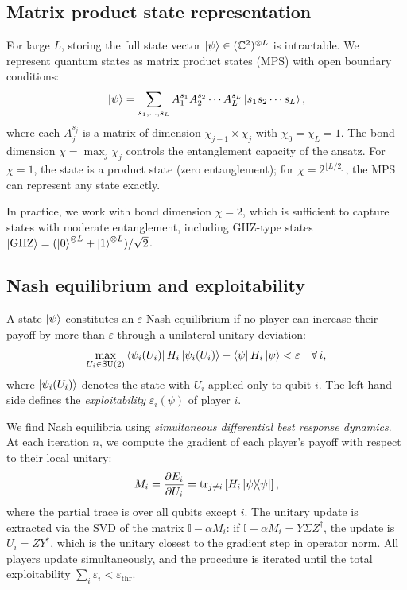 \documentclass[12pt]{article}
\begin{document}
\subsection{Matrix product state representation}

For large $L$, storing the full state vector $\ket{\psi} \in (\mathbb{C}^2)^{\otimes L}$ is intractable.
We represent quantum states as matrix product states (MPS) with open boundary conditions:
\begin{equation}
    \ket{\psi} = \sum_{s_1, \ldots, s_L} A_1^{s_1} A_2^{s_2} \cdots A_L^{s_L} \ket{s_1 s_2 \cdots s_L},
\end{equation}
where each $A_j^{s_j}$ is a matrix of dimension $\chi_{j-1} \times \chi_j$ with $\chi_0 = \chi_L = 1$.
The bond dimension $\chi = \max_j \chi_j$ controls the entanglement capacity of the ansatz.
For $\chi = 1$, the state is a product state (zero entanglement);
for $\chi = 2^{\lfloor L/2 \rfloor}$, the MPS can represent any state exactly.

In practice, we work with bond dimension $\chi = 2$, which is sufficient to capture
states with moderate entanglement, including GHZ-type states
$\ket{\mathrm{GHZ}} = (\ket{0}^{\otimes L} + \ket{1}^{\otimes L})/\sqrt{2}$.

\subsection{Nash equilibrium and exploitability}

A state $\ket{\psi}$ constitutes an $\varepsilon$-Nash equilibrium if no player can increase their payoff
by more than $\varepsilon$ through a unilateral unitary deviation:
\begin{equation}
    \max_{U_i \in \mathrm{SU}(2)} \bra{\psi_i(U_i)} H_i \ket{\psi_i(U_i)} - \bra{\psi} H_i \ket{\psi} < \varepsilon \quad \forall\, i,
\end{equation}
where $\ket{\psi_i(U_i)}$ denotes the state with $U_i$ applied only to qubit $i$.
The left-hand side defines the \emph{exploitability} $\varepsilon_i(\psi)$ of player $i$.

We find Nash equilibria using \emph{simultaneous differential best response dynamics}.
At each iteration $n$, we compute the gradient of each player's payoff with respect to
their local unitary:
\begin{equation}
    M_i = \pdv{E_i}{U_i} = \tr_{j \neq i}\left[ H_i \ketbra{\psi}{\psi} \right],
\end{equation}
where the partial trace is over all qubits except $i$.
The unitary update is extracted via the SVD of the matrix $\mathbb{I} - \alpha M_i$:
if $\mathbb{I} - \alpha M_i = Y \Sigma Z^\dagger$, the update is $U_i = Z Y^\dagger$,
which is the unitary closest to the gradient step in operator norm.
All players update simultaneously, and the procedure is iterated until
the total exploitability $\sum_i \varepsilon_i < \varepsilon_{\mathrm{thr}}$.
\end{document}
